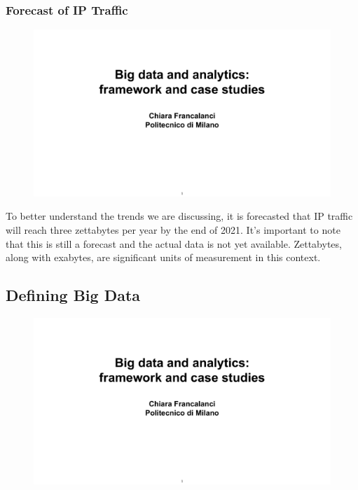 \subsubsection{Forecast of IP Traffic}

\begin{figure}[!h]
    \centering
    \includegraphics[page=28, trim = 1.5cm 4.3cm 1.5cm 3.8cm, clip, width=\textwidth]{images/06 - BIG_DATA.pdf}
\end{figure}

To better understand the trends we are discussing, it is forecasted that
IP traffic will reach three zettabytes per year by the end of 2021. It's
important to note that this is still a forecast and the actual data is
not yet available. Zettabytes, along with exabytes, are significant
units of measurement in this context.

\subsection{Defining Big Data}

\begin{figure}[!h]
    \centering
    \includegraphics[page=29, trim = 1.5cm 6.5cm 1.5cm 4.5cm, clip, width=\textwidth]{images/06 - BIG_DATA.pdf}
\end{figure}

